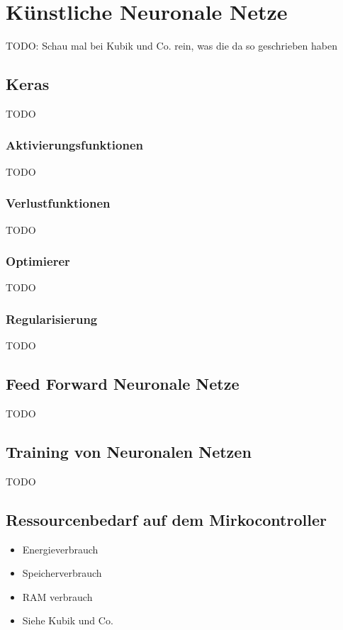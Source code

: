 \chapter{Künstliche Neuronale Netze}
TODO: Schau mal bei Kubik und Co. rein, was die da so geschrieben haben

\section{Keras}
TODO

\subsection{Aktivierungsfunktionen}
TODO

\subsection{Verlustfunktionen}
TODO

\subsection{Optimierer}
TODO

\subsection{Regularisierung}
TODO

\section{Feed Forward Neuronale Netze}
TODO

\section{Training von Neuronalen Netzen}
TODO

\section{Ressourcenbedarf auf dem Mirkocontroller}
\begin{itemize}
    \item Energieverbrauch
    \item Speicherverbrauch
    \item RAM verbrauch
    \item Siehe Kubik und Co.
\end{itemize}